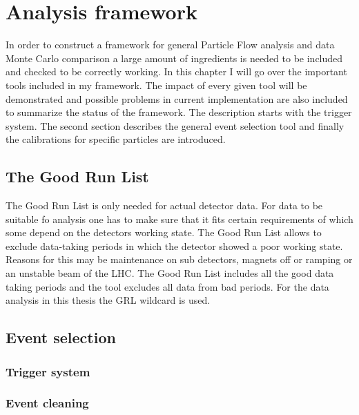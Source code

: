 \chapter{Analysis framework}

In order to construct a framework for general Particle Flow analysis and data Monte Carlo comparison a large amount of ingredients is needed to be included and checked to be correctly working. In this chapter I will go over the important tools included in my framework. The impact of every given tool will be demonstrated and possible problems in current implementation are also included to summarize the status of the framework.
The description starts with the trigger system. The second section describes the general event selection tool and finally the calibrations for specific particles are introduced.


\section{The Good Run List}

The Good Run List is only needed for actual detector data. For data to be suitable fo analysis one has to make sure that it fits certain requirements of which some depend on the detectors working state. The Good Run List allows to exclude data-taking periods in which the detector showed a poor working state. Reasons for this may be maintenance on sub detectors, magnets off or ramping or an unstable beam of the LHC.
The Good Run List includes all the good data taking periods and the tool excludes all data from bad periods.
For the data analysis in this thesis the GRL wildcard is used.

\section{Event selection}

\subsection{Trigger system}

\subsection{Event cleaning}









